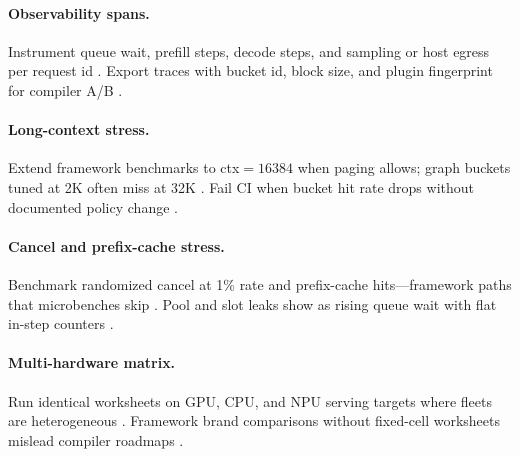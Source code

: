 \paragraph{Observability spans.} Instrument queue wait, prefill steps, decode steps, and sampling or host egress per request id \citep{patel2025llminference,kwon2023vllm,memoryfloor2026,taxbreak2026,yirage2026,chen2020compilerbasedhardw,liu2024deepseekv3,nvidia2024cudagraphs,dao2022flashattention,amd2024aie,amd2024xdna,dlbook,dao2023flashdecoding,nvidia2022hopper,semianalysis2024tma}. Export traces with bucket id, block size, and plugin fingerprint for compiler A/B \citep{patel2025llminference,yirage2026,chen2020compilerbasedhardw,kwon2023vllm,memoryfloor2026,taxbreak2026,dlbook}.

\paragraph{Long-context stress.} Extend framework benchmarks to ctx${=}16384$ when paging allows; graph buckets tuned at 2K often miss at 32K \citep{kwon2023vllm,dao2022flashattention,nvidia2024cudagraphs,yirage2026,chen2020compilerbasedhardw,patel2025llminference,memoryfloor2026,taxbreak2026,liu2024deepseekv3,amd2024aie,amd2024xdna,dlbook,dao2023flashdecoding,nvidia2022hopper,semianalysis2024tma}. Fail CI when bucket hit rate drops without documented policy change \citep{nvidia2024cudagraphs,kwon2023vllm,patel2025llminference,yirage2026,chen2020compilerbasedhardw,memoryfloor2026,taxbreak2026,dlbook}.

\paragraph{Cancel and prefix-cache stress.} Benchmark randomized cancel at 1\% rate and prefix-cache hits---framework paths that microbenches skip \citep{kwon2023vllm,patel2025llminference,yirage2026,chen2020compilerbasedhardw,memoryfloor2026,taxbreak2026,liu2024deepseekv3,nvidia2024cudagraphs,dao2022flashattention,amd2024aie,amd2024xdna,dlbook,dao2023flashdecoding,nvidia2022hopper,semianalysis2024tma}. Pool and slot leaks show as rising queue wait with flat in-step counters \citep{patel2025llminference,kwon2023vllm,yirage2026,chen2020compilerbasedhardw,memoryfloor2026,taxbreak2026,dlbook}.

\paragraph{Multi-hardware matrix.} Run identical worksheets on GPU, CPU, and NPU serving targets where fleets are heterogeneous \citep{amd2024xdna,amd2024aie,yirage2026,chen2020compilerbasedhardw,patel2025llminference,kwon2023vllm,taxbreak2026,memoryfloor2026,liu2024deepseekv3,nvidia2024cudagraphs,dao2022flashattention,dlbook,dao2023flashdecoding,nvidia2022hopper,semianalysis2024tma}. Framework brand comparisons without fixed-cell worksheets mislead compiler roadmaps \citep{patel2025llminference,taxbreak2026,memoryfloor2026,yirage2026,chen2020compilerbasedhardw,dlbook}.

